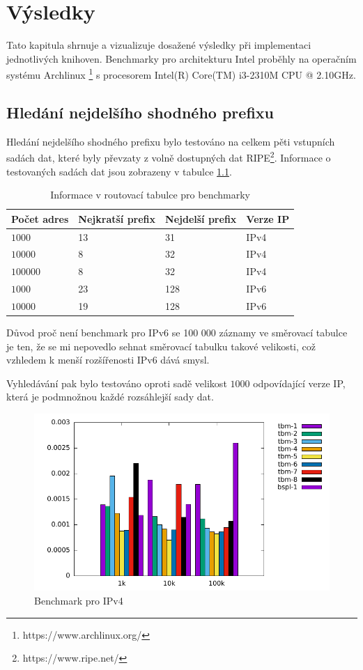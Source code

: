 \chapter{Výsledky}\label{chapter:results}
Tato kapitula shrnuje a vizualizuje dosažené výsledky při implementaci jednotlivých knihoven.
Benchmarky pro architekturu Intel proběhly na operačním systému Archlinux \footnote{https://www.archlinux.org/} s procesorem Intel(R) Core(TM) i3-2310M CPU @ 2.10GHz.

\section{Hledání nejdelšího shodného prefixu}

Hledání nejdelšího shodného prefixu bylo testováno na celkem pěti vstupních sadách dat, které
byly převzaty z volně dostupných dat RIPE\footnote{https://www.ripe.net/}.
Informace o testovaných sadách dat jsou zobrazeny v tabulce \ref{tab:lpm-input}.

\begin{table}[!htbp]
	\center
	\label{tab:lpm-input}
    \begin{tabular}{|l|l|l|l|}
    \hline
    Počet adres & Nejkratší prefix & Nejdelší prefix & Verze IP \\ \hline
    $1000$ & 13 & 31 & IPv4 \\ \hline
    $10000$ & 8 & 32 & IPv4 \\ \hline
    $100000$ & 8 & 32 & IPv4 \\ \hline
    $1000$ & 23 & 128 & IPv6 \\ \hline
    $10000$ & 19 & 128 & IPv6 \\ \hline
    \end{tabular}
	\caption{Informace v routovací tabulce pro benchmarky}
\end{table}

Důvod proč není benchmark pro IPv6 se 100 000 záznamy ve směrovací tabulce je ten, že se mi nepovedlo
sehnat směrovací tabulku takové velikosti, což vzhledem k menší rozšířenosti IPv6 dává smysl.

Vyhledávání pak bylo testováno oproti sadě velikost $1000$ odpovídající verze IP, která je podmnožnou každé
rozsáhlejší sady dat.

\begin{figure}[!htbp]
	\centering
	\includegraphics[scale=1]{fig/lpm-ipv4.pdf}
	\caption{Benchmark pro IPv4}
\end{figure}\label{fig:lpm-ipv4}

